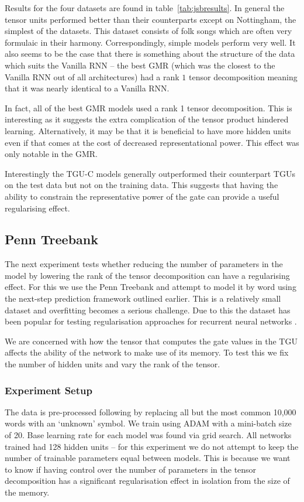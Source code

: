 Results for the four datasets are found in table~\ref{tab:jsbresults}. 
In general the tensor units performed better than their counterparts except on
Nottingham, the simplest of the datasets. This dataset consists of folk songs which
are often very formulaic in their harmony. Correspondingly, simple models
perform very well. It also seems to be the case that there is something about the structure
of the data which suits the Vanilla RNN -- the best GMR (which was the closest to the
Vanilla RNN out of all architectures) had a rank \(1\) tensor decomposition meaning
that it was nearly identical to a Vanilla RNN.

In fact, all of the best GMR models used a rank 1 tensor decomposition. This is interesting
as it suggests the extra complication of the tensor product hindered learning.
Alternatively, it may be that it is beneficial to have more
hidden units even if that comes at the cost of decreased representational power. This effect
was only notable in the GMR. 

Interestingly the TGU-C models generally outperformed their counterpart TGUs on the test data but
not on the training data. This suggests that having the ability to constrain the representative
power of the gate can provide a useful regularising effect.

\subsection{Penn Treebank}
The next experiment tests whether reducing the number of parameters in the model by lowering
the rank of the tensor decomposition can have a regularising effect. For this we use the
Penn Treebank \autocite{Marcus1993} and attempt to model it by word using the next-step prediction
framework outlined earlier. This is a relatively small dataset and overfitting becomes a serious
challenge. Due to this the dataset has been popular for testing regularisation approaches for
recurrent neural networks \autocite{Zaremba2014, Gal2015}.

We are concerned with how the tensor that computes the gate values in the TGU affects the ability of
the network to make use of its memory. To test this we fix the number of hidden units and vary the
rank of the tensor.

\subsubsection{Experiment Setup}
The data is pre-processed following \autocite{Zaremba2014} by replacing all but the most common
10,000 words with an `unknown' symbol. We train using ADAM with a mini-batch size of 20. Base learning
rate for each model was found via grid search.
All networks trained had 128 hidden units -- for this experiment we do not attempt to keep the number
of trainable parameters equal between models. This is because we want to know if having control over the
number of parameters in the tensor decomposition has a significant regularisation effect in isolation
from the size of the memory.

